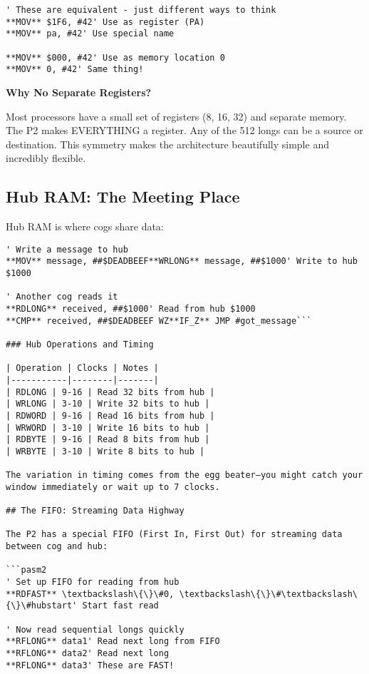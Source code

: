 \documentclass[11pt]{book}
\begin{document}
\begin{lstlisting}
' These are equivalent - just different ways to think
**MOV** $1F6, #42' Use as register (PA)
**MOV** pa, #42' Use special name
        
**MOV** $000, #42' Use as memory location 0
**MOV** 0, #42' Same thing!
\end{lstlisting}

\begin{sidetrack}
\textbf{Why No Separate Registers?}

Most processors have a small set of registers (8, 16, 32) and separate memory. The P2 makes EVERYTHING a register. Any of the 512 longs can be a source or destination. This symmetry makes the architecture beautifully simple and incredibly flexible.
\end{sidetrack}

\hypertarget{hub-ram-the-meeting-place}{%
\subsection{Hub RAM: The Meeting
Place}\label{hub-ram-the-meeting-place}}

Hub RAM is where cogs share data:

\begin{lstlisting}
' Write a message to hub
**MOV** message, ##$DEADBEEF**WRLONG** message, ##$1000' Write to hub $1000
        
' Another cog reads it
**RDLONG** received, ##$1000' Read from hub $1000
**CMP** received, ##$DEADBEEF WZ**IF_Z** JMP #got_message```

### Hub Operations and Timing

| Operation | Clocks | Notes |
|-----------|--------|-------|
| RDLONG | 9-16 | Read 32 bits from hub |
| WRLONG | 3-10 | Write 32 bits to hub |
| RDWORD | 9-16 | Read 16 bits from hub |
| WRWORD | 3-10 | Write 16 bits to hub |
| RDBYTE | 9-16 | Read 8 bits from hub |
| WRBYTE | 3-10 | Write 8 bits to hub |

The variation in timing comes from the egg beater—you might catch your window immediately or wait up to 7 clocks.

## The FIFO: Streaming Data Highway

The P2 has a special FIFO (First In, First Out) for streaming data between cog and hub:

```pasm2
' Set up FIFO for reading from hub
**RDFAST** \textbackslash\{\}\#0, \textbackslash\{\}\#\textbackslash\{\}\#hubstart' Start fast read
        
' Now read sequential longs quickly
**RFLONG** data1' Read next long from FIFO
**RFLONG** data2' Read next long
**RFLONG** data3' These are FAST!
\end{lstlisting}
\end{document}
